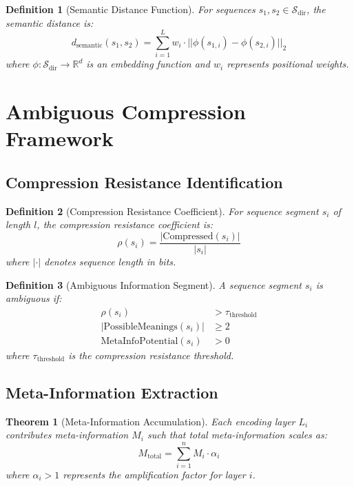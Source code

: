 \documentclass[12pt,a4paper]{article}
\newtheorem{theorem}{Theorem}
\newtheorem{definition}{Definition}
\begin{document}
\begin{definition}[Semantic Distance Function]
For sequences $s_1, s_2 \in \mathcal{S}_{\text{dir}}$, the semantic distance is:
\begin{equation}
d_{\text{semantic}}(s_1, s_2) = \sum_{i=1}^{L} w_i \cdot ||\phi(s_{1,i}) - \phi(s_{2,i})||_2
\end{equation}
where $\phi: \mathcal{S}_{\text{dir}} \to \mathbb{R}^d$ is an embedding function and $w_i$ represents positional weights.
\end{definition}

\section{Ambiguous Compression Framework}

\subsection{Compression Resistance Identification}

\begin{definition}[Compression Resistance Coefficient]
For sequence segment $s_i$ of length $l$, the compression resistance coefficient is:
\begin{equation}
\rho(s_i) = \frac{|\text{Compressed}(s_i)|}{|s_i|}
\end{equation}
where $|\cdot|$ denotes sequence length in bits.
\end{definition}

\begin{definition}[Ambiguous Information Segment]
A sequence segment $s_i$ is ambiguous if:
\begin{align}
\rho(s_i) &> \tau_{\text{threshold}} \\
|\text{PossibleMeanings}(s_i)| &\geq 2 \\
\text{MetaInfoPotential}(s_i) &> 0
\end{align}
where $\tau_{\text{threshold}}$ is the compression resistance threshold.
\end{definition}

\subsection{Meta-Information Extraction}

\begin{theorem}[Meta-Information Accumulation]
Each encoding layer $L_i$ contributes meta-information $M_i$ such that total meta-information scales as:
\begin{equation}
M_{\text{total}} = \sum_{i=1}^{n} M_i \cdot \alpha_i
\end{equation}
where $\alpha_i > 1$ represents the amplification factor for layer $i$.
\end{theorem}
\end{document}
